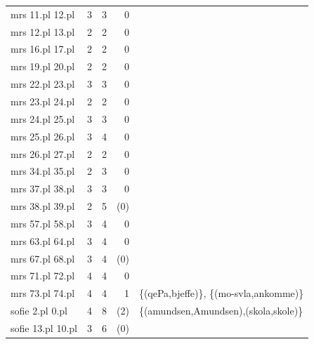 \documentclass[12pt,a4paper,oneside,draft]{report}
\begin{document}
\begin{table}[htb]
\begin{center}
\begin{tabular}{lrrrl}
 mrs 11.pl 12.pl    &      3  &      3  &         0  &                                                \\
 mrs 12.pl 13.pl    &      2  &      2  &         0  &                                                \\
 mrs 16.pl 17.pl    &      2  &      2  &         0  &                                                \\
 mrs 19.pl 20.pl    &      2  &      2  &         0  &                                                \\
 mrs 22.pl 23.pl    &      3  &      3  &         0  &                                                \\
 mrs 23.pl 24.pl    &      2  &      2  &         0  &                                                \\
 mrs 24.pl 25.pl    &      3  &      3  &         0  &                                                \\
 mrs 25.pl 26.pl    &      3  &      4  &         0  &                                                \\
 mrs 26.pl 27.pl    &      2  &      2  &         0  &                                                \\
 mrs 34.pl 35.pl    &      2  &      3  &         0  &                                                \\
 mrs 37.pl 38.pl    &      3  &      3  &         0  &                                                \\
 mrs 38.pl 39.pl    &      2  &      5  &       (0)  &                                                \\
 mrs 57.pl 58.pl    &      3  &      4  &         0  &                                                \\
 mrs 63.pl 64.pl    &      3  &      4  &         0  &                                                \\
 mrs 67.pl 68.pl    &      3  &      4  &       (0)  &                                                \\
 mrs 71.pl 72.pl    &      4  &      4  &         0  &                                                \\
 mrs 73.pl 74.pl    &      4  &      4  &         1  &  \{(qePa,bjeffe)\}, \{(mo-svla,ankomme)\}      \\
 sofie 2.pl 0.pl    &      4  &      8  &       (2)  &  \{(amundsen,Amundsen),(skola,skole)\}         \\
 sofie 13.pl 10.pl  &      3  &      6  &       (0)  &                                                \\
\end{tabular}
\end{center}
\end{table}
\end{document}
